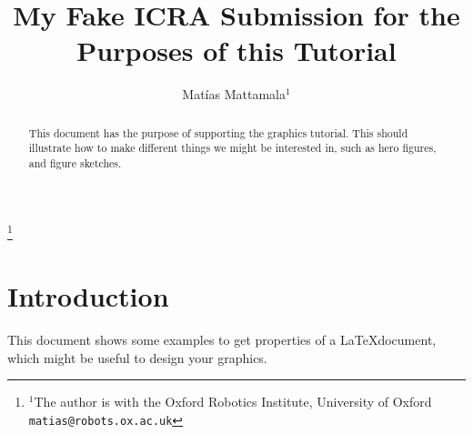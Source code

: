 \documentclass[letterpaper, 10 pt, conference]{ieeeconf}  %
\begin{document}
\title{\LARGE \bf
My Fake ICRA Submission for the Purposes of this Tutorial
}

\author{Mat{\'i}as Mattamala$^{1}$
}



\begingroup
  \renewcommand\thefootnote{}\footnote{
  $^{1}$The author is with the Oxford Robotics Institute, University of Oxford
  {\tt\small matias@robots.ox.ac.uk}
  }
  \addtocounter{footnote}{-1}%
\endgroup



\begin{abstract}
    This document has the purpose of supporting the graphics tutorial. This should illustrate how to make different things we might be interested in, such as hero figures, and figure sketches.
\end{abstract}

\section{Introduction}
This document shows some examples to get properties of a \LaTeX document, which might be useful to design your graphics.
\end{document}

